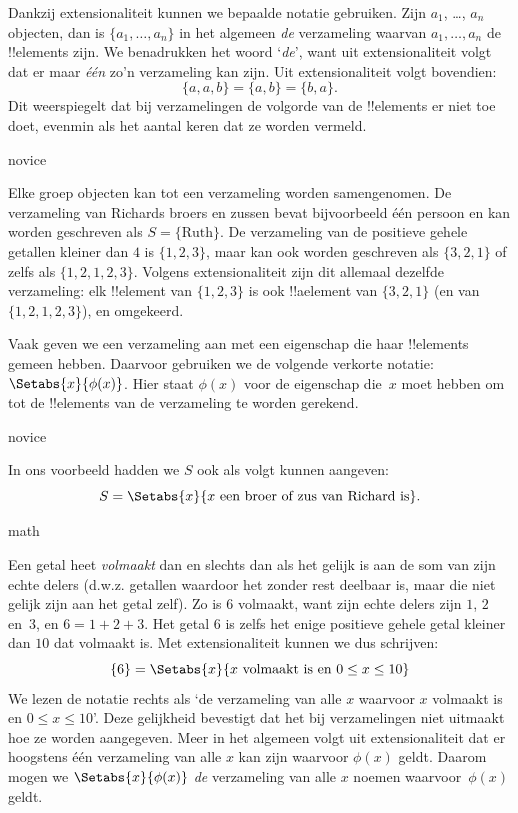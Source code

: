 \documentclass[openany]{memoir}
\begin{document}
Dankzij extensionaliteit kunnen we bepaalde notatie gebruiken. Zijn
$a_{1}$, \dots, $a_{n}$ objecten, dan is $\{a_{1}, \dots, a_{n}\}$ in
het algemeen \emph{de} verzameling waarvan $a_1, \ldots, a_n$ de
!!{element}s zijn. We benadrukken het woord ‘\emph{de}’, want uit
extensionaliteit volgt dat er maar \emph{één} zo'n verzameling kan
zijn. Uit extensionaliteit volgt bovendien:
  \[
    \{a, a, b\} = \{a, b\} = \{b,a\}.
  \] 
Dit weerspiegelt dat bij verzamelingen de volgorde van de
!!{element}s er niet toe doet, evenmin als het aantal keren dat ze
worden vermeld.

\begin{tagblock}{novice}
\begin{ex}
Elke groep objecten kan tot een verzameling worden samengenomen. De
verzameling van Richards broers en zussen bevat bijvoorbeeld één
persoon en kan worden geschreven als $S=\{\textrm{Ruth}\}$. De
verzameling van de positieve gehele getallen kleiner dan $4$ is
$\{1, 2, 3\}$, maar kan ook worden geschreven als $\{3, 2, 1\}$ of
zelfs als $\{1, 2, 1, 2, 3\}$. Volgens extensionaliteit zijn dit
allemaal dezelfde verzameling: elk !!{element} van $\{1, 2, 3\}$ is
ook !!a{element} van $\{3, 2, 1\}$ (en van $\{1, 2, 1, 2, 3\}$), en
omgekeerd.
\end{ex} 
\end{tagblock}

Vaak geven we een verzameling aan met een eigenschap die haar
!!{element}s gemeen hebben. Daarvoor gebruiken we de volgende verkorte
notatie: $\Setabs{x}{\phi(x)}$. Hier staat $\phi(x)$ voor de
eigenschap die~$x$ moet hebben om tot de !!{element}s van de
verzameling te worden gerekend.

\begin{tagblock}{novice}
\begin{ex}
In ons voorbeeld hadden we $S$ ook als volgt kunnen aangeven:
\[
S = \Setabs{x}{x \text{ een broer of zus van Richard is}}.
\]
\end{ex}
\end{tagblock}

\begin{tagblock}{math}
\begin{ex}
Een getal heet \emph{volmaakt} dan en slechts dan als het gelijk is
aan de som van zijn echte delers (d.w.z. getallen waardoor het zonder
rest deelbaar is, maar die niet gelijk zijn aan het getal zelf). Zo is
$6$ volmaakt, want zijn echte delers zijn $1$, $2$ en~$3$, en
$6 = 1 + 2 + 3$. Het getal $6$ is zelfs het enige positieve gehele
getal kleiner dan $10$ dat volmaakt is. Met extensionaliteit kunnen we
dus schrijven:
\[
	\{6\} = \Setabs{x}{x\text{ volmaakt is en }0 \leq x \leq 10}
\]
We lezen de notatie rechts als ‘de verzameling van alle $x$ waarvoor
$x$ volmaakt is en $0 \leq x \leq 10$’. Deze gelijkheid bevestigt dat
het bij verzamelingen niet uitmaakt hoe ze worden aangegeven. Meer in
het algemeen volgt uit extensionaliteit dat er hoogstens één verzameling
van alle $x$ kan zijn waarvoor $\phi(x)$ geldt. Daarom mogen we
$\Setabs{x}{\phi(x)}$ \emph{de} verzameling van alle $x$ noemen
waarvoor~$\phi(x)$ geldt.
\end{ex}
\end{tagblock}
\end{document}

